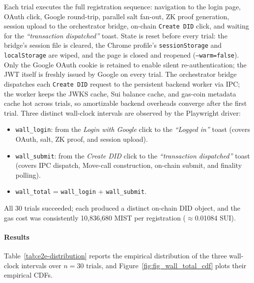 Each trial executes the full registration sequence: navigation to the
login page, OAuth click, Google round-trip, parallel salt fan-out, ZK
proof generation, session upload to the orchestrator bridge, on-chain
\texttt{Create DID} click, and waiting for the
\emph{``transaction dispatched''} toast. State is reset before every
trial: the bridge's session file is cleared, the Chrome profile's
\texttt{sessionStorage} and \texttt{localStorage} are wiped, and the
page is closed and reopened (\texttt{--warm=false}). Only the Google
OAuth cookie is retained to enable silent re-authentication; the JWT
itself is freshly issued by Google on every trial. The orchestrator
bridge dispatches each \texttt{Create DID} request to the persistent
backend worker via IPC; the worker keeps the JWKS cache, Sui balance
cache, and gas-coin metadata cache hot across trials, so amortizable
backend overheads converge after the first trial. Three distinct
wall-clock intervals are observed by the Playwright driver:
\begin{itemize}\itemsep0pt
  \item \texttt{wall\_login}: from the \emph{Login with Google} click
        to the \emph{``Logged in''} toast (covers OAuth, salt, ZK
        proof, and session upload).
  \item \texttt{wall\_submit}: from the \emph{Create DID} click to the
        \emph{``transaction dispatched''} toast (covers IPC dispatch,
        Move-call construction, on-chain submit, and finality polling).
  \item \texttt{wall\_total} = \texttt{wall\_login} + \texttt{wall\_submit}.
\end{itemize}
All 30 trials succeeded; each produced a distinct on-chain DID object,
and the gas cost was consistently 10{,}836{,}680 MIST per registration
(\(\approx\)0.01084 SUI).

\paragraph{Results}
\label{sec:e2e-results}

Table~\ref{tab:e2e-distribution} reports the empirical distribution of
the three wall-clock intervals over $n = 30$ trials, and
Figure~\ref{fig:fig_wall_total_cdf} plots their empirical CDFs.

